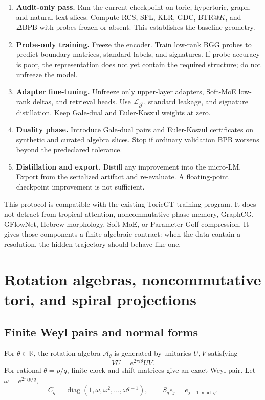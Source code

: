 \documentclass[11pt]{article}
\theoremstyle{definition}
\theoremstyle{plain}
\theoremstyle{remark}
\numberwithin{equation}{section}
\newcommand{\R}{\mathbb{R}}
\newcommand{\A}{\mathcal{A}}
\newcommand{\diag}{\operatorname{diag}}
\begin{document}
\begin{enumerate}[leftmargin=2em]
  \item \textbf{Audit-only pass.}  Run the current checkpoint on toric, hypertoric, graph, and natural-text slices.  Compute RCS, SFL, KLR, GDC, BTR@$K$, and $\Delta\mathrm{BPB}$ with probes frozen or absent.  This establishes the baseline geometry.
  \item \textbf{Probe-only training.}  Freeze the encoder.  Train low-rank BGG probes to predict boundary matrices, standard labels, and signatures.  If probe accuracy is poor, the representation does not yet contain the required structure; do not unfreeze the model.
  \item \textbf{Adapter fine-tuning.}  Unfreeze only upper-layer adapters, Soft-MoE low-rank deltas, and retrieval heads.  Use $\mathcal L_{\partial^2}$, standard leakage, and signature distillation.  Keep Gale-dual and Euler-Koszul weights at zero.
  \item \textbf{Duality phase.}  Introduce Gale-dual pairs and Euler-Koszul certificates on synthetic and curated algebra slices.  Stop if ordinary validation BPB worsens beyond the predeclared tolerance.
  \item \textbf{Distillation and export.}  Distill any improvement into the micro-LM.  Export from the serialized artifact and re-evaluate.  A floating-point checkpoint improvement is not sufficient.
\end{enumerate}

This protocol is compatible with the existing ToricGT training program.  It does not detract from tropical attention, noncommutative phase memory, GraphCG, GFlowNet, Hebrew morphology, Soft-MoE, or Parameter-Golf compression.  It gives those components a finite algebraic contract: when the data contain a resolution, the hidden trajectory should behave like one.


\section{Rotation algebras, noncommutative tori, and spiral projections}

\subsection{Finite Weyl pairs and normal forms}

For $\theta\in\R$, the rotation algebra $\A_\theta$ is generated by unitaries $U,V$ satisfying
\begin{equation}
  VU=e^{2\pi i\theta}UV.
\end{equation}
For rational $\theta=p/q$, finite clock and shift matrices give an exact Weyl pair.  Let $\omega=e^{2\pi i p/q}$,
\begin{equation}
  C_q=\diag(1,\omega,\omega^2,\ldots,\omega^{q-1}),\qquad S_q e_j=e_{j-1\bmod q}.
\end{equation}
\end{document}
